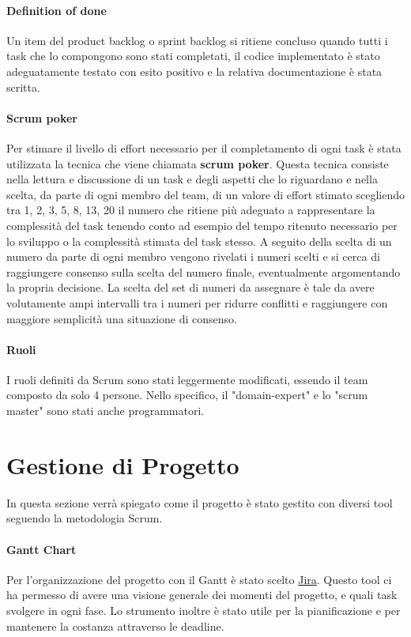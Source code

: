     \paragraph{Definition of done} Un item del product backlog o sprint backlog si ritiene concluso quando tutti i task che lo compongono sono stati completati, il codice implementato è stato adeguatamente testato con esito positivo e la relativa documentazione è stata scritta.
    
    \paragraph{Scrum poker} Per stimare il livello di effort necessario per il completamento di ogni task è stata utilizzata la tecnica che viene chiamata \textbf{scrum poker}. Questa tecnica consiste nella lettura e discussione di un task e degli aspetti che lo riguardano e nella scelta, da parte di ogni membro del team, di un valore di effort stimato scegliendo tra 1, 2, 3, 5, 8, 13, 20 il numero che ritiene più adeguato a rappresentare la complessità del task tenendo conto ad esempio del tempo ritenuto necessario per lo sviluppo o la complessità stimata del task stesso. A seguito della scelta di un numero da parte di ogni membro vengono rivelati i numeri scelti e si cerca di raggiungere consenso sulla scelta del numero finale, eventualmente argomentando la propria decisione. La scelta del set di numeri da assegnare è tale da avere volutamente ampi intervalli tra i numeri per ridurre conflitti e raggiungere con maggiore semplicità una situazione di consenso.

    \paragraph{Ruoli}
    I ruoli definiti da Scrum sono stati leggermente modificati, essendo il team composto da solo 4 persone. Nello specifico, il "domain-expert" e lo "scrum master" sono stati anche programmatori. 
    


\section{Gestione di Progetto}
In questa sezione verrà spiegato come il progetto è stato gestito con diversi tool seguendo la metodologia Scrum.
    \paragraph{Gantt Chart} 
    Per l'organizzazione del progetto con il Gantt è stato scelto \href{https://riccardo-omiccioli.atlassian.net/jira/software/projects/IQ/boards/1/roadmap}{Jira}. Questo tool ci ha permesso di avere una visione generale dei momenti del progetto, e quali task svolgere in ogni fase. Lo strumento inoltre è stato utile per la pianificazione e per mantenere la costanza attraverso le deadline. 
    
